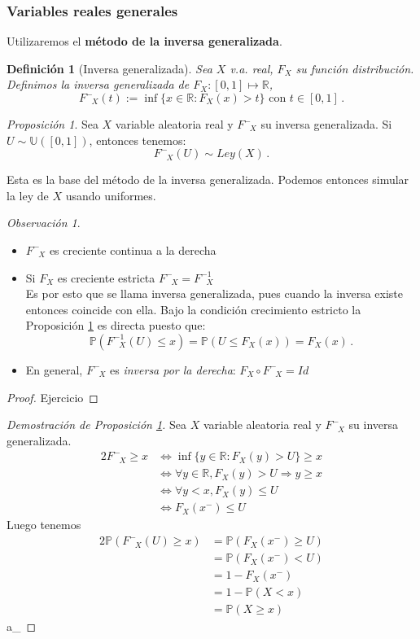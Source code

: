 \documentclass[letterpaper,11pt]{article} %
\theoremstyle{defbreak}
\newtheorem{definition}{Definición}[subsection]
\theoremstyle{propbreak}
\theoremstyle{remark}
\newtheorem{remark}{Observación}[subsection]
\theoremstyle{break}
\newtheorem{proposition}{Proposición}[subsection]
\def\ssi{\Longleftrightarrow}
\def\R{\mathbb{R}}
\def\P{\mathbb{P}}
\def\unif{\mathbb{U}([0,1])}
\def\ejercicio{\color{blue}Ejercicio\color{black}}
\def\beforeitemize{\leavevmode \vspace{-0.5\baselineskip}}
\def\gris{\color{mygray}}
\def\demejercicio{\begin{proof}\ejercicio\end{proof}}
\def\findem{\null\hfill\color{white}a\color{black}_\square}
\def\Finvgen{F^-_{\mbox{ }X}}
\def\Finv{F^{-1}_{\mbox{ }X}}
\begin{document}
\subsubsection{Variables reales generales}
Utilizaremos el \textbf{método de la inversa generalizada}.
\begin{definition}[Inversa generalizada]
\label{def:invgen}
Sea $X$ v.a. real, $F_X$ su función distribución. Definimos la inversa generalizada de $F_X:[0,1]\mapsto\R$,
$$ \Finvgen(t):=\inf\{x\in\R : F_X(x)>t\} \mbox{ con }t\in[0,1] \, .$$
\end{definition}
\begin{proposition}
\label{propinvgen}
Sea $X$ variable aleatoria real y $F^-_{\mbox{ }X}$ su inversa generalizada. Si $U\sim\unif$, entonces tenemos: $$\Finvgen(U) \sim Ley(X) \, .$$
\end{proposition}
Esta es la base del método de la inversa generalizada. Podemos entonces simular la ley de $X$ usando uniformes.
\begin{remark}
\beforeitemize
\begin{itemize}
    \item $\Finvgen$ es creciente continua a la derecha %
    \item Si $F_X$ es creciente estricta $\Finvgen=\Finv$ \\ Es por esto que se llama inversa generalizada, pues cuando la inversa existe entonces coincide con ella. %
    \newline Bajo la condición crecimiento estricto la Proposición \ref{propinvgen} es directa puesto que:
    $$ \P(\Finv(U)\leq x)= \P(U\leq F_X(x))=F_X(x) \, .$$
    \item En general, $\Finvgen$ es \textit{inversa por la derecha}: $F_X\circ \Finvgen=Id$ \\ %
\end{itemize}
\end{remark}
\demejercicio
\begin{proof}[Demostración de Proposición \ref{propinvgen}]
\gris Sea $X$ variable aleatoria real y $F^-_{\mbox{ }X}$ su inversa generalizada.
\begin{alignat*}{2}
    \Finvgen \geq x & \ssi \inf\{y\in\R : F_X(y)>U\}\geq x\\
     & \ssi \forall y \in \R, F_X(y)>U \Longrightarrow y\geq x \\
     & \ssi \forall y<x, F_X(y)\leq U \\
     & \ssi F_X(x^-)\leq U
\end{alignat*}
Luego tenemos
\begin{alignat*}{2}
    \P(\Finvgen(U) \geq x) & = \P( F_X(x^-) \geq U)\\
     & = \P ( F_X(x^-) < U) \\
     & = 1 - F_X(x^-) \\
     & = 1 - \P(X<x) \\
     & = \P(X\geq x)
\end{alignat*}
\findem
\end{proof}
\end{document}
